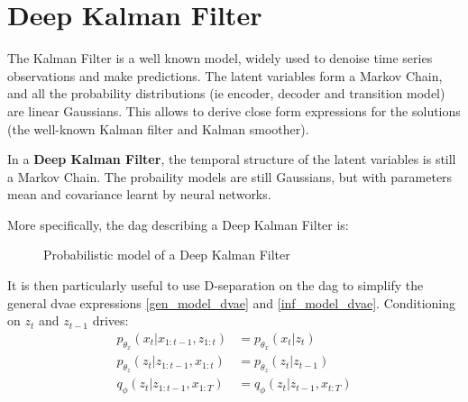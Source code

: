 \chapter{Deep Kalman Filter}\label{sec:DKF}

The Kalman Filter is a well known model, widely used to denoise time series observations and 
make predictions. The latent variables form a Markov Chain, and all the probability distributions 
(ie encoder, decoder and transition model) are linear Gaussians. This allows to derive close form expressions for the solutions 
(the well-known Kalman filter and Kalman smoother).

In a \textbf{Deep Kalman Filter}, the temporal structure of the latent variables is still a Markov Chain. The probaility models are still Gaussians, but with parameters mean and covariance learnt by neural networks.

More specifically, the \gls{dag} describing a Deep Kalman Filter is:

\begin{figure}[h]
    \centering
    \label{fig:graphical_model_dkf}
\caption{Probabilistic model of a Deep Kalman Filter}
\end{figure}

It is then particularly useful to use D-separation on the \gls{dag} to simplify the general \gls{dvae} expressions \ref{gen_model_dvae} and \ref{inf_model_dvae}. Conditioning on $z_t$ and $z_{t-1}$ drives:
\begin{align}
    p_{\theta_x}(x_t \vert x_{1:t-1}, z_{1:t}) &= p_{\theta_x}(x_t \vert z_t) \\
    p_{\theta_z}(z_t \vert z_{1:t-1}, x_{1:t}) &= p_{\theta_z}(z_t \vert z_{t-1}) \\
    \label{dkf_posterior}
    q_{\phi}(z_t \vert z_{1:t-1}, x_{1:T}) &= q_{\phi}(z_t \vert z_{t-1}, x_{t:T}) 
\end{align}

